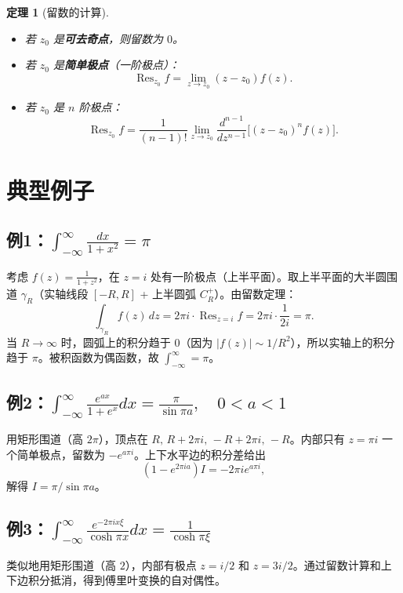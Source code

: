 \documentclass[UTF8]{ctexart}
\newtheorem{theorem}{定理}[section]
\numberwithin{equation}{section}
\begin{document}
\begin{theorem}[留数的计算]
\begin{itemize}
\item 若 \(z_0\) 是\textbf{可去奇点}，则留数为 \(0\)。
\item 若 \(z_0\) 是\textbf{简单极点}（一阶极点）：
\[
\operatorname{Res}_{z_0}f = \lim_{z\to z_0} (z-z_0)f(z).
\]
\item 若 \(z_0\) 是 \(n\) 阶极点：
\[
\operatorname{Res}_{z_0}f = \frac{1}{(n-1)!}\lim_{z\to z_0}\frac{d^{n-1}}{dz^{n-1}}\big[(z-z_0)^n f(z)\big].
\]
\end{itemize}
\end{theorem}

\section{典型例子}

\subsection{例1：\(\displaystyle \int_{-\infty}^{\infty} \frac{dx}{1+x^2} = \pi\)}
考虑 \(f(z)=\frac{1}{1+z^2}\)，在 \(z=i\) 处有一阶极点（上半平面）。取上半平面的大半圆围道 \(\gamma_R\)（实轴线段 \([-R,R]\) + 上半圆弧 \(C_R^+\)）。由留数定理：
\[
\int_{\gamma_R} f(z)\,dz = 2\pi i \cdot \operatorname{Res}_{z=i}f = 2\pi i \cdot \frac{1}{2i} = \pi.
\]
当 \(R\to\infty\) 时，圆弧上的积分趋于 \(0\)（因为 \(|f(z)|\sim 1/R^2\)），所以实轴上的积分趋于 \(\pi\)。被积函数为偶函数，故 \(\int_{-\infty}^{\infty} = \pi\)。

\subsection{例2：\(\displaystyle \int_{-\infty}^{\infty} \frac{e^{ax}}{1+e^x}dx = \frac{\pi}{\sin\pi a},\quad 0<a<1\)}
用矩形围道（高 \(2\pi\)），顶点在 \(R,\, R+2\pi i,\,-R+2\pi i,\,-R\)。内部只有 \(z=\pi i\) 一个简单极点，留数为 \(-e^{a\pi i}\)。上下水平边的积分差给出
\[
(1-e^{2\pi i a})I = -2\pi i e^{a\pi i},
\]
解得 \(I = \pi/\sin\pi a\)。

\subsection{例3：\(\displaystyle \int_{-\infty}^{\infty} \frac{e^{-2\pi i x\xi}}{\cosh\pi x}dx = \frac{1}{\cosh\pi\xi}\)}
类似地用矩形围道（高 \(2\)），内部有极点 \(z=i/2\) 和 \(z=3i/2\)。通过留数计算和上下边积分抵消，得到傅里叶变换的自对偶性。
\end{document}
